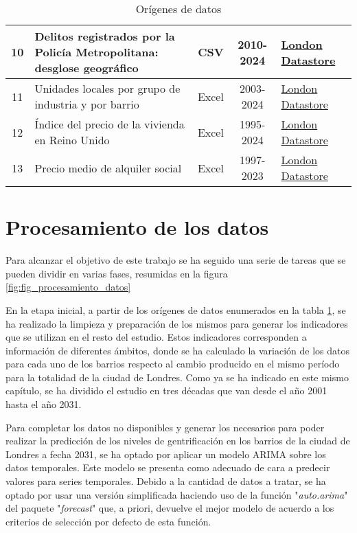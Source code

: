 \documentclass[12pt,a4paper,twoside]{book}
\begin{document}
\begin{table}[H]
\begin{tabular}{cm{15em}ccm{10em}}
       \hline
         10 & Delitos registrados por la Policía Metropolitana: desglose geográfico & CSV & 2010-2024 & \href{https://data.london.gov.uk/dataset/recorded_crime_summary}{London Datastore} \\
       \hline
         11 & Unidades locales por grupo de industria y por barrio & Excel & 2003-2024 & \href{https://data.london.gov.uk/dataset/local-units-broad-industry-group-borough}{London Datastore} \\
       \hline
         12 & Índice del precio de la vivienda en Reino Unido & Excel & 1995-2024 & \href{https://data.london.gov.uk/dataset/uk-house-price-index}{London Datastore} \\
       \hline
         13 & Precio medio de alquiler social & Excel & 1997-2023 & \href{https://data.london.gov.uk/dataset/registered-social-landlords-average-rents}{London Datastore} \\
       \hline
    \end{tabular}
    \caption{Orígenes de datos}
    \label{tab:tab_fuentes}
\end{table}

\section{Procesamiento de los datos}

Para alcanzar el objetivo de este trabajo se ha seguido una serie de tareas que se pueden dividir en varias fases, resumidas en la figura \ref{fig:fig_procesamiento_datos}

En la etapa inicial, a partir de los orígenes de datos enumerados en la tabla \ref{tab:tab_fuentes}, se ha realizado la limpieza y preparación de los mismos para generar los indicadores que se utilizan en el resto del estudio. Estos indicadores corresponden a información de diferentes ámbitos, donde se ha calculado la variación de los datos para cada uno de los barrios respecto al cambio producido en el mismo período para la totalidad de la ciudad de Londres. Como ya se ha indicado en este mismo capítulo, se ha dividido el estudio en tres décadas que van desde el año 2001 hasta el año 2031.

Para completar los datos no disponibles y generar los necesarios para poder realizar la predicción de los niveles de gentrificación en los barrios de la ciudad de Londres a fecha 2031, se ha optado por aplicar un modelo ARIMA sobre los datos temporales. Este modelo se presenta como adecuado de cara a predecir valores para series temporales. Debido a la cantidad de datos a tratar, se ha optado por usar una versión simplificada haciendo uso de la función "\textit{auto.arima}" del paquete "\textit{forecast}" que, a priori, devuelve el mejor modelo de acuerdo a los criterios de selección por defecto de esta función.
\end{document}
